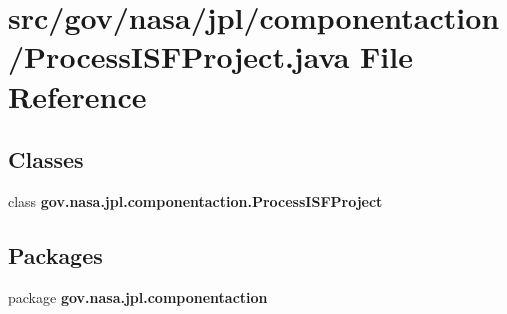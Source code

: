 \section{src/gov/nasa/jpl/componentaction/\+Process\+I\+S\+F\+Project.java File Reference}
\label{_process_i_s_f_project_8java}
\subsection*{Classes}
\begin{DoxyCompactItemize}
\item 
class {\bf gov.\+nasa.\+jpl.\+componentaction.\+Process\+I\+S\+F\+Project}
\end{DoxyCompactItemize}
\subsection*{Packages}
\begin{DoxyCompactItemize}
\item 
package {\bf gov.\+nasa.\+jpl.\+componentaction}
\end{DoxyCompactItemize}
